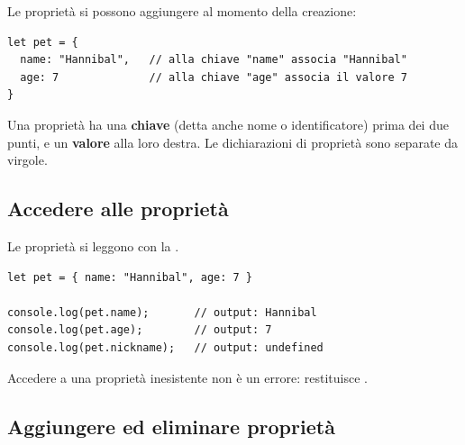 Le proprietà si possono aggiungere al momento della creazione:

\begin{affianco}[0.6][c]
\begin{lstlisting}[style=js, name=pet.js]
let pet = {
  name: "Hannibal",   // alla chiave "name" associa "Hannibal"
  age: 7              // alla chiave "age" associa il valore 7
}
\end{lstlisting}
\risultato
\begin{immagine}
\end{immagine}
\end{affianco}

Una proprietà ha una \textbf{chiave} (detta anche nome o identificatore) prima
dei due punti, e un \textbf{valore} alla loro destra. Le dichiarazioni di
proprietà sono separate da virgole.

\subsection{Accedere alle proprietà}

Le proprietà si leggono con la .

\begin{lstlisting}[style=js, name=accesso.js]
let pet = { name: "Hannibal", age: 7 }

console.log(pet.name);       // output: Hannibal
console.log(pet.age);        // output: 7
console.log(pet.nickname);   // output: undefined
\end{lstlisting}

Accedere a una proprietà inesistente non è un errore: restituisce
.

\subsection{Aggiungere ed eliminare proprietà}

